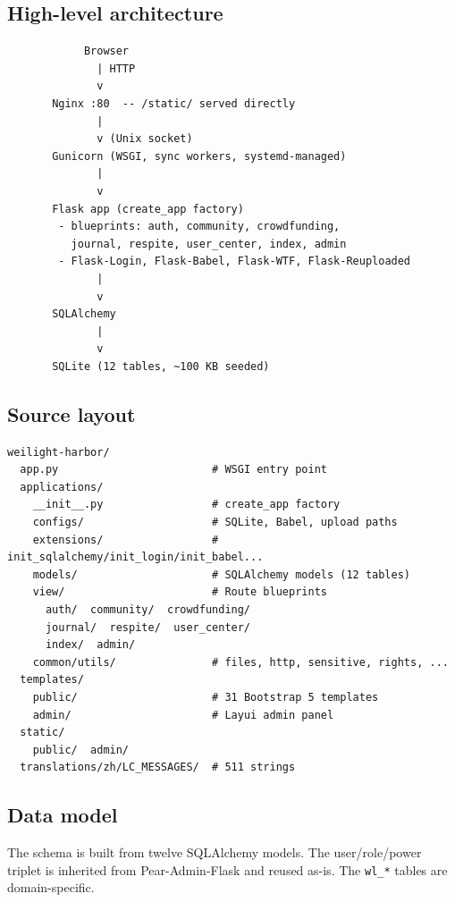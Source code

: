\subsection{High-level architecture}
\begin{verbatim}
            Browser
              | HTTP
              v
       Nginx :80  -- /static/ served directly
              |
              v (Unix socket)
       Gunicorn (WSGI, sync workers, systemd-managed)
              |
              v
       Flask app (create_app factory)
        - blueprints: auth, community, crowdfunding,
          journal, respite, user_center, index, admin
        - Flask-Login, Flask-Babel, Flask-WTF, Flask-Reuploaded
              |
              v
       SQLAlchemy
              |
              v
       SQLite (12 tables, ~100 KB seeded)
\end{verbatim}

\subsection{Source layout}
\begin{lstlisting}
weilight-harbor/
  app.py                        # WSGI entry point
  applications/
    __init__.py                 # create_app factory
    configs/                    # SQLite, Babel, upload paths
    extensions/                 # init_sqlalchemy/init_login/init_babel...
    models/                     # SQLAlchemy models (12 tables)
    view/                       # Route blueprints
      auth/  community/  crowdfunding/
      journal/  respite/  user_center/
      index/  admin/
    common/utils/               # files, http, sensitive, rights, ...
  templates/
    public/                     # 31 Bootstrap 5 templates
    admin/                      # Layui admin panel
  static/
    public/  admin/
  translations/zh/LC_MESSAGES/  # 511 strings
\end{lstlisting}

\subsection{Data model}
The schema is built from twelve SQLAlchemy models. The user/role/power
triplet is inherited from Pear-Admin-Flask and reused as-is. The
\texttt{wl\_*} tables are domain-specific.

